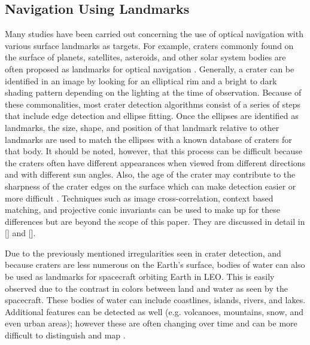 \documentclass[]{aiaa-tc}%
\begin{document}
\subsection{Navigation Using Landmarks}
Many studies have been carried out concerning the use of optical navigation with various surface landmarks as targets.  For example, craters commonly found on the surface of planets, satellites, asteroids, and other solar system bodies are often proposed as landmarks for optical navigation \cite{Cheng:2003,Rowell:2013,Hanak,Rohr:2011,Cheng:2003b}.  Generally, a crater can be identified in an image by looking for an elliptical rim and a bright to dark shading pattern depending on the lighting at the time of observation.  Because of these commonalities, most crater detection algorithms consist of a series of steps that include edge detection and ellipse fitting.  Once the ellipses are identified as landmarks, the size, shape, and position of that landmark relative to other landmarks are used to match the ellipses with a known database of craters for that body\cite{Hanak}.  It should be noted, however, that this process can be difficult because the craters often have different appearances when viewed from different directions and with different sun angles.  Also, the age of the crater may contribute to the sharpness of the crater edges on the surface which can make detection easier or more difficult \cite{Cheng:2003}. Techniques such as image cross-correlation, context based matching, and projective conic invariants can be used to make up for these differences but are beyond the scope of this paper. They are discussed in detail in [] and [].

Due to the previously mentioned irregularities seen in crater detection, and because craters are less numerous on the Earth's surface, bodies of water can also be used as landmarks for spacecraft orbiting Earth in LEO.  This is easily observed due to the contrast in colors between land and water as seen by the spacecraft.  These bodies of water can include coastlines, islands, rivers, and lakes.  Additional features can be detected as well (e.g. volcanoes, mountains, snow, and even urban areas); however these are often changing over time and can be more difficult to distinguish and map \cite{SeenFromSpace}.

\end{document}
